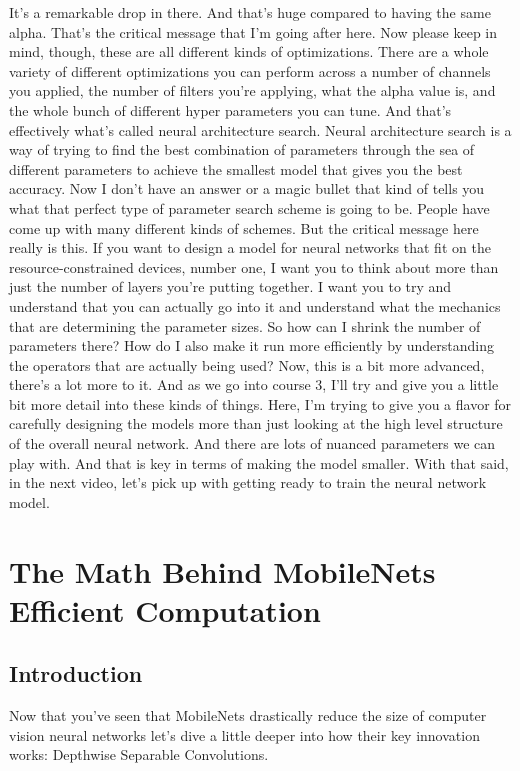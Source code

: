It's a remarkable drop in there.
And that's huge compared to having the same alpha.
That's the critical message that I'm going after here.
Now please keep in mind, though, these are all different kinds
of optimizations.
There are a whole variety of different optimizations you
can perform across a number of channels you applied,
the number of filters you're applying, what the alpha value is,
and the whole bunch of different hyper parameters you can tune.
And that's effectively what's called neural architecture search.
Neural architecture search is a way of trying
to find the best combination of parameters
through the sea of different parameters to achieve the smallest model that
gives you the best accuracy.
Now I don't have an answer or a magic bullet that kind of tells you
what that perfect type of parameter search scheme is going to be.
People have come up with many different kinds of schemes.
But the critical message here really is this.
If you want to design a model for neural networks
that fit on the resource-constrained devices, number one,
I want you to think about more than just the number
of layers you're putting together.
I want you to try and understand that you can actually go into it
and understand what the mechanics that are determining the parameter sizes.
So how can I shrink the number of parameters there?
How do I also make it run more efficiently
by understanding the operators that are actually being used?
Now, this is a bit more advanced, there's a lot more to it.
And as we go into course 3, I'll try and give you a little bit more
detail into these kinds of things.
Here, I'm trying to give you a flavor for carefully designing
the models more than just looking at the high level structure
of the overall neural network.
And there are lots of nuanced parameters we can play with.
And that is key in terms of making the model smaller.
With that said, in the next video, let's pick up
with getting ready to train the neural network model.

\section{The Math Behind MobileNets Efficient Computation}

\subsection{Introduction}

Now that you’ve seen that MobileNets drastically reduce the size of computer vision neural networks let’s dive a little deeper into how their key innovation works: Depthwise Separable Convolutions.

